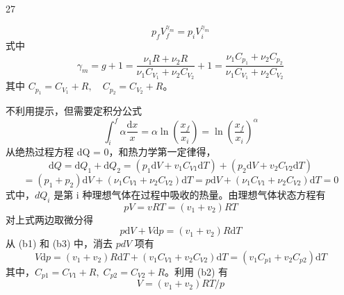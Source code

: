 \begin{solution}{27}
\begin{subsolution}
\begin{subproblem}[证法（a）]
\begin{equation}
        p_{f} V_{f}^{\gamma_{m}} = p_{i} V_{i}^{\gamma_{m}}
        \label{eq:a2}
      \end{equation}
      式中
      \begin{equation}
        \gamma_{m} = g + 1 = \frac{\nu_{1} R + \nu_{2} R}{\nu_{1} C_{V_{1}} + \nu_{2} C_{V_{2}}} + 1 = \frac{\nu_{1} C_{p_{1}} + \nu_{2} C_{p_{2}}}{\nu_{1} C_{V_{1}} + \nu_{2} C_{V_{2}}}
      \end{equation}
      其中 $C_{p_{1}} = C_{V_{1}} + R, \quad C_{p_{2}} = C_{V_{2}} + R$。
    \end{subproblem}
    \begin{subproblem}[证法（b）]
      不利用提示，但需要定积分公式
      \begin{equation}
        \int_{i}^{f} \alpha \frac{\mathrm{d} x}{x} = \alpha \ln (\frac{x_{f}}{x_{i}}) = \ln (\frac{x_{f}}{x_{i}})^{\alpha}
      \end{equation}
      从绝热过程方程 dQ = 0，和热力学第一定律得，
      \begin{equation}
        \mathrm{d} Q = \mathrm{d} Q_{1} + \mathrm{d} Q_{2} = (p_{1} \mathrm{d} V + v_{1} C_{V 1} \mathrm{d} T) + (p_{2} \mathrm{d} V + v_{2} C_{V 2} \mathrm{d} T)
        \label{eq:b1}
      \end{equation}
      \begin{equation}
        = (p_{1} + p_{2}) \mathrm{d} V + (\nu_{1} C_{V 1} + \nu_{2} C_{V 2}) \mathrm{d} T = p \mathrm{d} V + (\nu_{1} C_{V 1} + \nu_{2} C_{V 2}) \mathrm{d} T = 0
      \end{equation}
      式中，$dQ_{i}$ 是第 i 种理想气体在过程中吸收的热量。由理想气体状态方程有
      \begin{equation}
        p V = v R T = (v_{1} + v_{2}) R T
        \label{eq:b2}
      \end{equation}
      对上式两边取微分得
      \begin{equation}
        p \mathrm{d} V + V \mathrm{d} p = (v_{1} + v_{2}) R \mathrm{d} T
        \label{eq:b3}
      \end{equation}
      从 (b1) 和 (b3) 中，消去 $pdV$ 项有
      \begin{equation}
        V \mathrm{d} p = (v_{1} + v_{2}) R \mathrm{d} T + (v_{1} C_{V 1} + v_{2} C_{V 2}) \mathrm{d} T = (v_{1} C_{p 1} + v_{2} C_{p 2}) \mathrm{d} T
        \label{eq:b4}
      \end{equation}
      其中，$C_{p1}=C_{V1}+R,\;C_{p2}=C_{V2}+R$。利用 (b2) 有
      \begin{equation}
        V = (v_{1} + v_{2}) R T / p

\end{equation}
\end{subproblem}
\end{subsolution}
\end{solution}
